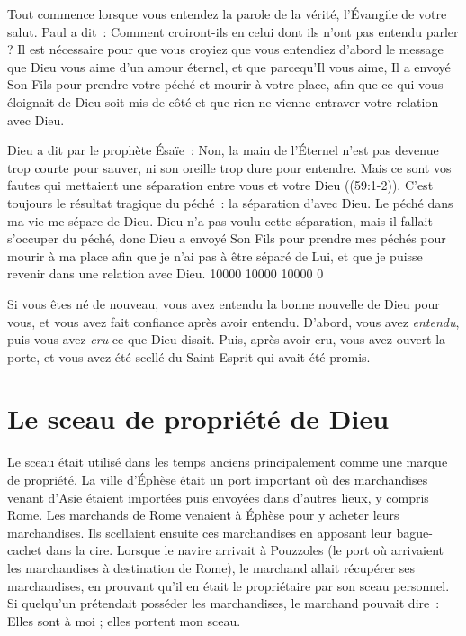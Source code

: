 Tout commence lorsque vous entendez \og la parole de la vérité,
 l'Évangile de votre salut. \fg{} Paul a dit~:
 \og Comment croiront-ils en celui dont ils n'ont pas entendu parler ? \fg{}
 Il est nécessaire pour que vous croyiez que vous entendiez d'abord le message
 que Dieu vous aime d'un amour éternel, et que parcequ'Il vous aime,
 Il a envoyé Son Fils pour prendre votre péché et mourir à votre place,
 afin que ce qui vous éloignait de Dieu soit mis de côté et que rien
 ne vienne entraver votre relation avec Dieu.

Dieu a dit par le prophète Ésaïe~:
 \og Non, la main de l'Éternel n'est pas devenue trop courte pour sauver,
 ni son oreille trop dure pour entendre. Mais ce sont vos fautes qui mettaient
 une séparation entre vous et votre Dieu \fg{} ((59:1-2)).
 C'est toujours le résultat tragique du péché~: la séparation d'avec Dieu.
 Le péché dans ma vie me sépare de Dieu.
 Dieu n'a pas voulu cette séparation, mais il fallait s'occuper du péché,
 donc Dieu a envoyé Son Fils pour prendre mes péchés
 \ocadr pour mourir à ma place \ocadr afin que je n'ai pas
 à être séparé de Lui, et que je puisse revenir
 dans une relation avec Dieu.
 \begingroup{} 10000 10000 10000 0
 \par\endgroup

Si vous êtes né de nouveau, vous avez entendu
 la bonne nouvelle de Dieu pour vous, et vous avez fait confiance
 après avoir entendu. D'abord, vous avez \emph{entendu},
 puis vous avez \emph{cru} ce que Dieu disait.
 Puis, après avoir cru, vous avez ouvert la porte,
 et vous avez été \og scellé du Saint-Esprit qui avait été promis. \fg{}


\section{Le sceau de propri\'et\'e de Dieu}

\begin{specialpar}{}
Le sceau était utilisé dans les temps anciens principalement
 comme une marque de propriété.
 La ville d'Éphèse était un port important où des marchandises
 venant d'Asie étaient importées puis envoyées dans d'autres lieux,
 y compris Rome.
 Les marchands de Rome venaient à Éphèse pour y acheter leurs marchandises.
 Ils scellaient ensuite ces marchandises en apposant leur bague-cachet
 dans la cire.
 Lorsque le navire arrivait à Pouzzoles
 (le port où arrivaient les marchandises à destination de Rome),
 le marchand allait récupérer ses marchandises,
 en prouvant qu'il en était le propriétaire par son sceau personnel.
 Si quelqu'un prétendait posséder les marchandises,
 le marchand pouvait dire~:
 \og Elles sont à moi ; elles portent mon sceau. \fg{}
\end{specialpar}

